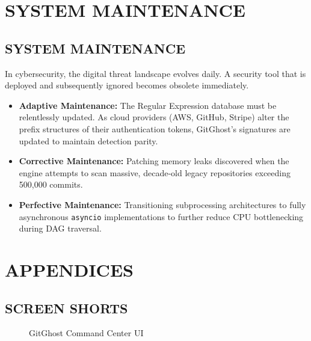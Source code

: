 \documentclass[12pt, a4paper, oneside]{report}
\begin{document}
\chapter{SYSTEM MAINTENANCE}

\section{SYSTEM MAINTENANCE}
In cybersecurity, the digital threat landscape evolves daily. A security tool that is deployed and subsequently ignored becomes obsolete immediately.
\begin{itemize}
    \item \textbf{Adaptive Maintenance:} The Regular Expression database must be relentlessly updated. As cloud providers (AWS, GitHub, Stripe) alter the prefix structures of their authentication tokens, GitGhost’s signatures are updated to maintain detection parity.
    \item \textbf{Corrective Maintenance:} Patching memory leaks discovered when the engine attempts to scan massive, decade-old legacy repositories exceeding 500,000 commits.
    \item \textbf{Perfective Maintenance:} Transitioning subprocessing architectures to fully asynchronous \texttt{asyncio} implementations to further reduce CPU bottlenecking during DAG traversal.
\end{itemize}

\chapter{APPENDICES}

\section{SCREEN SHORTS}

\begin{figure}[H]
    \centering
    \caption{GitGhost Command Center UI}
\end{figure}
\end{document}
